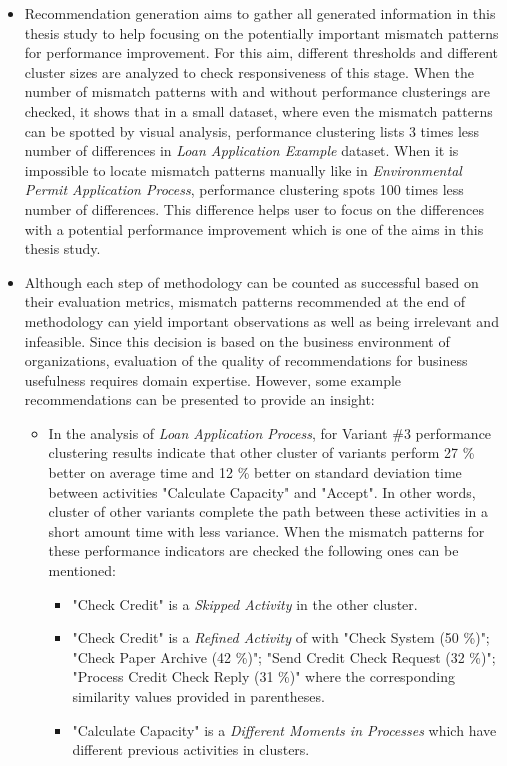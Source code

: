 \begin{itemize}
	\item Recommendation generation aims to gather all generated information in this thesis study to help focusing on the potentially important mismatch patterns for performance improvement. For this aim, different thresholds and different cluster sizes are analyzed to check responsiveness of this stage. When the number of mismatch patterns with and without performance clusterings are checked, it shows that in a small dataset, where even the mismatch patterns can be spotted by visual analysis, performance clustering lists 3 times less number of differences in \textit{Loan Application Example} dataset. When it is impossible to locate mismatch patterns manually like in \textit{Environmental Permit Application Process}, performance clustering spots 100 times less number of differences. This difference helps user to focus on the differences with a potential performance improvement which is one of the aims in this thesis study.
	\item Although each step of methodology can be counted as successful based on their evaluation metrics, mismatch patterns recommended at the end of methodology can yield important observations as well as being irrelevant and infeasible. Since this decision is based on the business environment of organizations, evaluation of the quality of recommendations for business usefulness requires domain expertise. However, some example recommendations can be presented to provide an insight:
	\begin{itemize}
	\item In the analysis of \textit{Loan Application Process}, for Variant \#3 performance clustering results indicate that other cluster of variants perform 27 \% better on average time and 12 \% better on standard deviation time between activities "Calculate Capacity" and "Accept". In other words, cluster of other variants complete the path between these activities in a short amount time with less variance. When the mismatch patterns for these performance indicators are checked the following ones can be mentioned:
		\begin{itemize}
		\item "Check Credit" is a \textit{Skipped Activity} in the other cluster.
		\item "Check Credit" is a \textit{Refined Activity} of with "Check System (50 \%)"; "Check Paper Archive (42 \%)"; "Send Credit Check Request (32 \%)"; "Process Credit Check Reply (31 \%)" where the corresponding similarity values provided in parentheses.
		\item "Calculate Capacity" is a \textit{Different Moments in Processes} which have different previous activities in clusters. 

\end{itemize}
\end{itemize}
\end{itemize}
